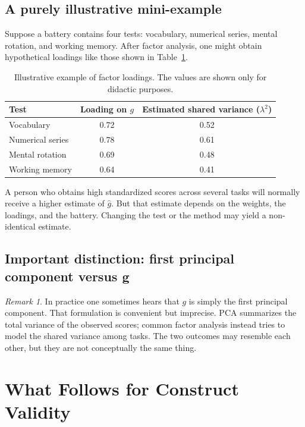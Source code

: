 \documentclass[10pt, a4paper]{article}
\theoremstyle{plain}
\theoremstyle{definition}
\theoremstyle{remark}
\newtheorem{remark}{Remark}
\begin{document}
\subsection{A purely illustrative mini-example}

Suppose a battery contains four tests: vocabulary, numerical series, mental
rotation, and working memory. After factor analysis, one might obtain
hypothetical loadings like those shown in Table~\ref{tab:loadings}.

\begin{table}[t]
    \centering
    \begin{tabular}{lcc}
        \toprule
        \textbf{Test} & \textbf{Loading on $g$} & \textbf{Estimated shared variance ($\lambda^2$)} \\
        \midrule
        Vocabulary & 0.72 & 0.52 \\
        Numerical series & 0.78 & 0.61 \\
        Mental rotation & 0.69 & 0.48 \\
        Working memory & 0.64 & 0.41 \\
        \bottomrule
    \end{tabular}
    \caption{Illustrative example of factor loadings. The values are shown only
    for didactic purposes.}
    \label{tab:loadings}
\end{table}

A person who obtains high standardized scores across several tasks will normally
receive a higher estimate of $\hat{g}$. But that estimate depends on the
weights, the loadings, and the battery. Changing the test or the method may
yield a non-identical estimate.

\subsection{Important distinction: first principal component versus g}

\begin{remark}
In practice one sometimes hears that $g$ is simply the first principal
component. That formulation is convenient but imprecise. PCA summarizes the
total variance of the observed scores; common factor analysis instead tries to
model the shared variance among tasks. The two outcomes may resemble each other,
but they are not conceptually the same thing.
\end{remark}

\section{What Follows for Construct Validity}
\label{sec:validity}
\end{document}

